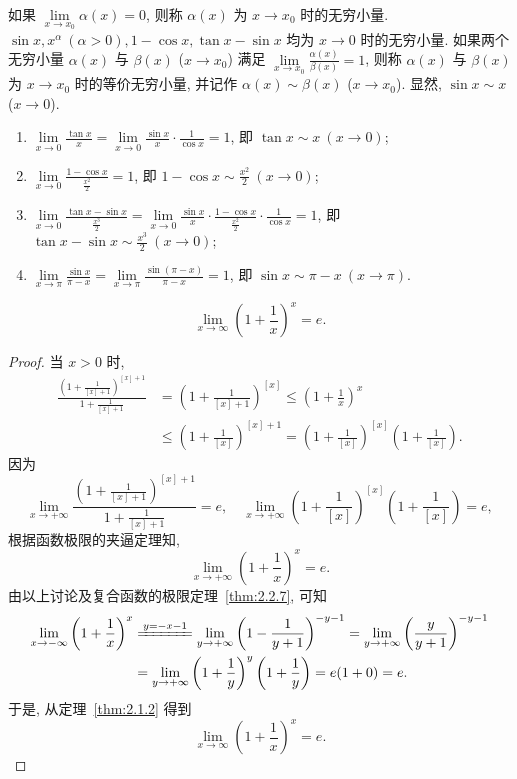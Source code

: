 \begin{definition}\label{def:2.2.2}
如果 $\lim\limits_{x\to x_0}\alpha(x)=0$, 则称 $\alpha(x)$ 为 $x \to x_{0}$ 时的无穷小量.
$\sin x, x^{\alpha}\ (\alpha > 0), 1-\cos x, \tan x-\sin x$ 均为 $x\to 0$ 时的无穷小量. 如果两个无穷小量 $\alpha(x)$ 与 $\beta(x)$ ($x\to x_{0}$) 满足 $\lim\limits_{x\to x_{0}}\frac{\alpha(x)}{\beta(x)}=1$, 则称 $\alpha(x)$ 与 $\beta(x)$ 为 $x\to x_{0}$ 时的等价无穷小量, 并记作 $\alpha(x)\sim\beta(x)$ ($x\to x_{0}$). 显然, $\sin x\sim x$ ($x\to 0$).
\end{definition}

\begin{example}\label{ex:2.2.9}
\begin{enumerate}[label=(\arabic*)]
  \item $\lim\limits_{x\to 0}\frac{\tan x}{x}=\lim\limits_{x\to 0}\frac{\sin x}{x}\cdot\frac{1}{\cos x}=1$, 即 $\tan x\sim x\ (x\to 0)$;
  \item $\lim\limits_{x\to 0}\frac{1-\cos x}{\frac{x^{2}}{2}}=1$, 即 $1-\cos x \sim \frac{x^2}{2}\ (x\to 0)$;
  \item $\lim\limits_{x\to 0}\frac{\tan x-\sin x}{\frac{x^{3}}{2}}=\lim\limits_{x\to 0}\frac{\sin x}{x}\cdot\frac{1-\cos x}{\frac{x^{2}}{2}}\cdot\frac{1}{\cos x}=1$, 即 $\tan x-\sin x\sim\frac{x^{3}}{2}\ (x\to 0)$;
  \item $\lim\limits_{x \to \pi} \frac{\sin x}{\pi - x} = \lim\limits_{x \to \pi} \frac{\sin(\pi - x)}{\pi - x} = 1$, 即 $\sin x \sim \pi - x\ (x \to \pi)$.
\end{enumerate}
\end{example}

\begin{example}[两个重要极限之二]\label{ex:2.2.10}
\[
\lim_{x\to\infty}\left(1+\frac{1}{x}\right)^{x}=e.
\]
\end{example}

\begin{proof}
当 $x>0$ 时,
\begin{align*}
\frac{\left(1+\frac{1}{[x]+1}\right)^{[x]+1}}{1+\frac{1}{[x]+1}} &= \left(1+\frac{1}{[x]+1}\right)^{[x]} \leqslant \left(1+\frac{1}{x}\right)^{x} \\
&\leqslant \left(1+\frac{1}{[x]}\right)^{[x]+1} = \left(1+\frac{1}{[x]}\right)^{[x]}\left(1+\frac{1}{[x]}\right).
\end{align*}
因为
\[
\lim_{x\to+\infty}\frac{\left(1+\frac{1}{[x]+1}\right)^{[x]+1}}{1+\frac{1}{[x]+1}}=e, \quad \lim_{x\to+\infty}\left(1+\frac{1}{[x]}\right)^{[x]}\left(1+\frac{1}{[x]}\right)=e,
\]
根据函数极限的夹逼定理知,
\[
\lim_{x\to+\infty}\left(1+\frac{1}{x}\right)^{x}=e.
\]
由以上讨论及复合函数的极限定理~\ref{thm:2.2.7}, 可知
\begin{align*}
\lim_{x\to-\infty}\left(1+\frac{1}{x}\right)^{x} &\xlongequal{y=-x-1} \lim_{y\to+\infty}\left(1-\frac{1}{y+1}\right)^{-y-1} = \lim_{y\to+\infty}\left(\frac{y}{y+1}\right)^{-y-1} \\
&= \lim_{y\to+\infty}\left(1+\frac{1}{y}\right)^{y}\left(1+\frac{1}{y}\right)=e(1+0)=e.
\end{align*}
于是, 从定理~\ref{thm:2.1.2} 得到
\[
\lim_{x\to\infty}\left(1+\frac{1}{x}\right)^{x}=e.
\]
\end{proof}

